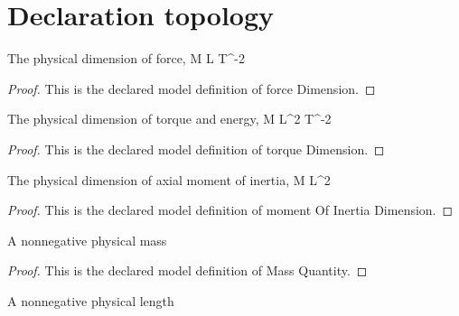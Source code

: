 \section{Declaration topology}
\begin{definition}
  \label{def:physics:phyx-mini-0781:phyxminiproblems-problemphyxmini0781-forcedimension}
  The physical dimension of force, M L T\textasciicircum{}-2
\end{definition}
\begin{proof}
  This is the declared model definition of force Dimension.
\end{proof}
\begin{definition}
  \label{def:physics:phyx-mini-0781:phyxminiproblems-problemphyxmini0781-torquedimension}
  The physical dimension of torque and energy, M L\textasciicircum{}2 T\textasciicircum{}-2
\end{definition}
\begin{proof}
  This is the declared model definition of torque Dimension.
\end{proof}
\begin{definition}
  \label{def:physics:phyx-mini-0781:phyxminiproblems-problemphyxmini0781-momentofinertiadimension}
  The physical dimension of axial moment of inertia, M L\textasciicircum{}2
\end{definition}
\begin{proof}
  This is the declared model definition of moment Of Inertia Dimension.
\end{proof}
\begin{definition}
  \label{def:physics:phyx-mini-0781:phyxminiproblems-problemphyxmini0781-massquantity}
  A nonnegative physical mass
\end{definition}
\begin{proof}
  This is the declared model definition of Mass Quantity.
\end{proof}
\begin{definition}
  \label{def:physics:phyx-mini-0781:phyxminiproblems-problemphyxmini0781-lengthquantity}
  A nonnegative physical length
\end{definition}
